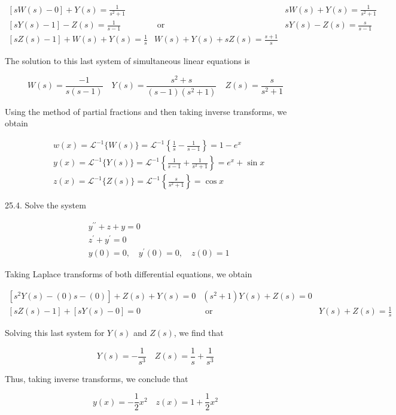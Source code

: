 \documentclass[10pt]{article}
\begin{document}
$$
\begin{array}{rll}
{[s W(s)-0]+Y(s)=\frac{1}{s^{2}+1}} & & s W(s)+Y(s)=\frac{1}{s^{2}+1} \\
{[s Y(s)-1]-Z(s)=\frac{1}{s-1}} & \text { or } & s Y(s)-Z(s)=\frac{s}{s-1} \\
{[s Z(s)-1]+W(s)+Y(s)=\frac{1}{s}} & W(s)+Y(s)+s Z(s)=\frac{s+1}{s}
\end{array}
$$

The solution to this last system of simultaneous linear equations is

$$
W(s)=\frac{-1}{s(s-1)} \quad Y(s)=\frac{s^{2}+s}{(s-1)\left(s^{2}+1\right)} \quad Z(s)=\frac{s}{s^{2}+1}
$$

Using the method of partial fractions and then taking inverse transforms, we obtain

$$
\begin{aligned}
& w(x)=\mathscr{L}^{-1}\{W(s)\}=\mathscr{L}^{-1}\left\{\frac{1}{s}-\frac{1}{s-1}\right\}=1-e^{x} \\
& y(x)=\mathscr{L}^{-1}\{Y(s)\}=\mathscr{L}^{-1}\left\{\frac{1}{s-1}+\frac{1}{s^{2}+1}\right\}=e^{x}+\sin x \\
& z(x)=\mathscr{L}^{-1}\{Z(s)\}=\mathscr{L}^{-1}\left\{\frac{s}{s^{2}+1}\right\}=\cos x
\end{aligned}
$$

25.4. Solve the system

$$
\begin{aligned}
& y^{\prime \prime}+z+y=0 \\
& z^{\prime}+y^{\prime}=0 \\
& y(0)=0, \quad y^{\prime}(0)=0, \quad z(0)=1
\end{aligned}
$$

Taking Laplace transforms of both differential equations, we obtain

$$
\begin{array}{ccc}
{\left[s^{2} Y(s)-(0) s-(0)\right]+Z(s)+Y(s)=0} & \left(s^{2}+1\right) Y(s)+Z(s)=0 \\
{[s Z(s)-1]+[s Y(s)-0]=0} & \text { or } & Y(s)+Z(s)=\frac{1}{s}
\end{array}
$$

Solving this last system for $Y(s)$ and $Z(s)$, we find that

$$
Y(s)=-\frac{1}{s^{3}} \quad Z(s)=\frac{1}{s}+\frac{1}{s^{3}}
$$

Thus, taking inverse transforms, we conclude that

$$
y(x)=-\frac{1}{2} x^{2} \quad z(x)=1+\frac{1}{2} x^{2}
$$
\end{document}
